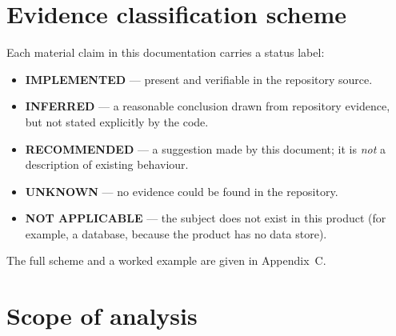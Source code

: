 \section*{Evidence classification scheme}

Each material claim in this documentation carries a status label:

\begin{itemize}
  \item \textbf{IMPLEMENTED} --- present and verifiable in the repository source.
  \item \textbf{INFERRED} --- a reasonable conclusion drawn from repository evidence,
        but not stated explicitly by the code.
  \item \textbf{RECOMMENDED} --- a suggestion made by this document; it is \emph{not}
        a description of existing behaviour.
  \item \textbf{UNKNOWN} --- no evidence could be found in the repository.
  \item \textbf{NOT APPLICABLE} --- the subject does not exist in this product
        (for example, a database, because the product has no data store).
\end{itemize}

The full scheme and a worked example are given in Appendix~C.

\section*{Scope of analysis}

